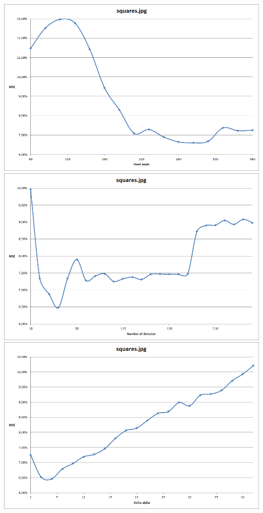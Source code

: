 \documentclass[a4paper,11pt]{article}
\begin{document}
\includegraphics[width=\textwidth]{squaresDeadAngle}
\includegraphics[width=\textwidth]{squaresDetectors}
\includegraphics[width=\textwidth]{squaresAlpha}
\end{document}
